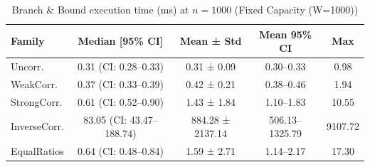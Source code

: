 \begin{table}[tb]
\centering
\caption{Branch $\&$ Bound execution time (ms) at $n=1000$ (Fixed Capacity (W=1000))}
\label{tab:fixed-bb-time}
\begin{tabular}{lcccc}
\toprule
Family & Median [95\% CI] & Mean ± Std & Mean 95\% CI & Max \\
\midrule
Uncorr. & 0.31 (CI: 0.28–0.33) & 0.31 ± 0.09 & 0.30–0.33 & 0.98 \\
WeakCorr. & 0.37 (CI: 0.33–0.39) & 0.42 ± 0.21 & 0.38–0.46 & 1.94 \\
StrongCorr. & 0.61 (CI: 0.52–0.90) & 1.43 ± 1.84 & 1.10–1.83 & 10.55 \\
InverseCorr. & 83.05 (CI: 43.47–188.74) & 884.28 ± 2137.14 & 506.13–1325.79 & 9107.72 \\
EqualRatios & 0.64 (CI: 0.48–0.84) & 1.59 ± 2.71 & 1.14–2.17 & 17.30 \\
\bottomrule
\end{tabular}
\end{table}
